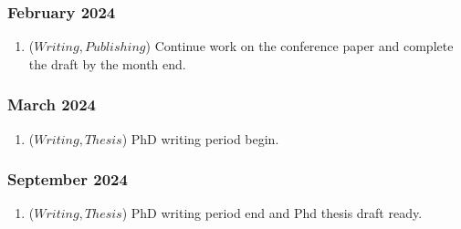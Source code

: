  \subsubsection{February 2024}
  \begin{enumerate}
    \item (\(Writing, Publishing\)) Continue work on the conference paper and complete the draft by the month end.
 \end{enumerate}

 \subsubsection{March 2024}
  \begin{enumerate}
    \item (\(Writing, Thesis\)) PhD writing period begin.
 \end{enumerate}

 \subsubsection{September 2024}
  \begin{enumerate}
    \item (\(Writing, Thesis\)) PhD writing period end and Phd thesis draft ready.
 \end{enumerate}











